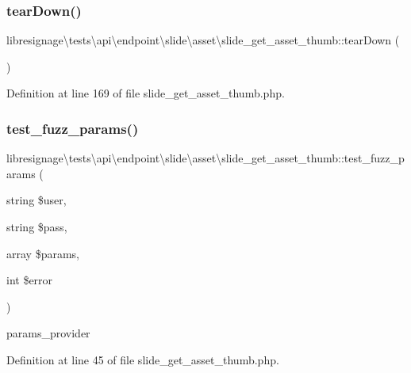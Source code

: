 \subsubsection{\texorpdfstring{tear\+Down()}{tearDown()}}
{\footnotesize\ttfamily libresignage\textbackslash{}tests\textbackslash{}api\textbackslash{}endpoint\textbackslash{}slide\textbackslash{}asset\textbackslash{}slide\+\_\+get\+\_\+asset\+\_\+thumb\+::tear\+Down (\begin{DoxyParamCaption}{ }\end{DoxyParamCaption})}



Definition at line 169 of file slide\+\_\+get\+\_\+asset\+\_\+thumb.\+php.

\mbox{\label{classlibresignage_1_1tests_1_1api_1_1endpoint_1_1slide_1_1asset_1_1slide__get__asset__thumb_aa5bd79ee4e59af92f760729967ef911b}} 
\subsubsection{\texorpdfstring{test\+\_\+fuzz\+\_\+params()}{test\_fuzz\_params()}}
{\footnotesize\ttfamily libresignage\textbackslash{}tests\textbackslash{}api\textbackslash{}endpoint\textbackslash{}slide\textbackslash{}asset\textbackslash{}slide\+\_\+get\+\_\+asset\+\_\+thumb\+::test\+\_\+fuzz\+\_\+params (\begin{DoxyParamCaption}\item[{string}]{\$user,  }\item[{string}]{\$pass,  }\item[{array}]{\$params,  }\item[{int}]{\$error }\end{DoxyParamCaption})}

params\+\_\+provider 

Definition at line 45 of file slide\+\_\+get\+\_\+asset\+\_\+thumb.\+php.

